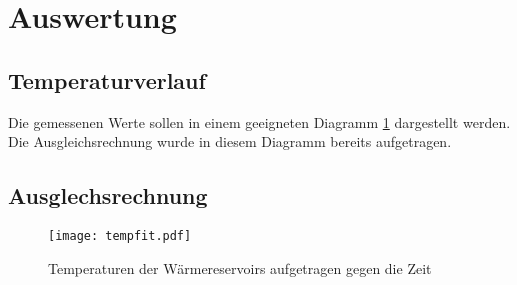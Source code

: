 \section{Auswertung}
\label{sec:Auswertung}
\subsection{Temperaturverlauf}
Die gemessenen Werte sollen in einem geeigneten Diagramm \ref{fig:tempfit} dargestellt werden.
Die Ausgleichsrechnung wurde in diesem Diagramm bereits aufgetragen.

\subsection{Ausglechsrechnung}
\begin{figure}[H]
  \centering
  \texttt{[image: tempfit.pdf]}
  \caption{Temperaturen der Wärmereservoirs aufgetragen gegen die Zeit}
  \label{fig:tempfit}
\end{figure}
